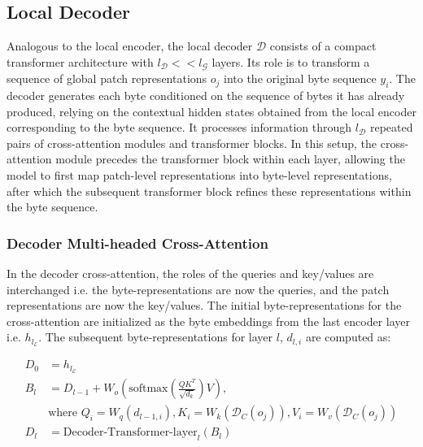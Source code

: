 \subsection{Local Decoder} 

Analogous to the local encoder, the local decoder $\mathcal{D}$ consists of a compact transformer architecture with $l_{\mathcal{D}} << l_{\mathcal{G}}$ layers. Its role is to transform a sequence of global patch representations $o_j$ into the original byte sequence $y_i$. The decoder generates each byte conditioned on the sequence of bytes it has already produced, relying on the contextual hidden states obtained from the local encoder corresponding to the byte sequence. It processes information through $l_{\mathcal{D}}$ repeated pairs of cross-attention modules and transformer blocks. In this setup, the cross-attention module precedes the transformer block within each layer, allowing the model to first map patch-level representations into byte-level representations, after which the subsequent transformer block refines these representations within the byte sequence.

\subsubsection{Decoder Multi-headed Cross-Attention} 

In the decoder cross-attention, the roles of the queries and key/values are interchanged i.e. the byte-representations are now the queries, and the patch representations are now the key/values. The initial byte-representations for the cross-attention are initialized as the byte embeddings from the last encoder layer i.e. $h_{l_{\mathcal{E}}}$. The subsequent byte-representations for layer $l$, $d_{l,i}$ are computed as:

\begin{align}
D_0 &= h_{l_{\mathcal{E}}} \\
B_l &= D_{l-1} + W_o\left(\text{softmax}\left(\frac{QK^T}{\sqrt{d_k}}\right)V\right), \\
  &\text{where } Q_i = W_q(d_{l-1,i}), K_i = W_k(\mathcal{D}_C(o_j)), V_i = W_v(\mathcal{D}_C(o_j)) \\
  D_l &= \text{Decoder-Transformer-layer}_l(B_l)
\end{align}

